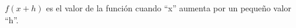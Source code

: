\documentclass[preview]{standalone}
\begin{document}
\begin{center}
$f(x + h)$ es el valor de la función cuando “x” aumenta por un pequeño valor “h”.
\end{center}
\end{document}
